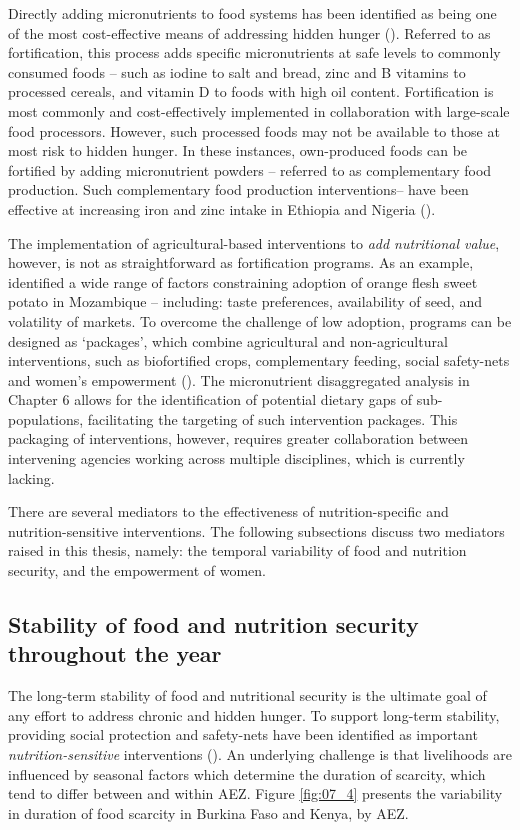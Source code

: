 Directly adding micronutrients to food systems has been identified as being one of the most cost-effective means of addressing hidden hunger (\citealp{Bhutta2013, Osendarp2018}). Referred to as fortification, this process adds specific micronutrients at safe levels to commonly consumed foods -- such as iodine to salt and bread, zinc and B vitamins to processed cereals, and vitamin D to foods with high oil content. Fortification is most commonly and cost-effectively implemented in collaboration with large-scale food processors. However, such processed foods may not be available to those at most risk to hidden hunger. In these instances, own-produced foods can be fortified by adding micronutrient powders -- referred to as complementary food production. Such complementary food production interventions-- have been effective at increasing iron and zinc intake in Ethiopia and Nigeria (\citealp{Masters2018}).

The implementation of agricultural-based interventions to \textit{add nutritional value}, however, is not as straightforward as fortification programs. As an example, \citet{Jenkins2018} identified a wide range of factors constraining adoption of orange flesh sweet potato in Mozambique -- including: taste preferences, availability of seed, and volatility of markets. To overcome the challenge of low adoption, programs can be designed as `packages', which combine agricultural and non-agricultural interventions, such as biofortified crops, complementary feeding, social safety-nets and women's empowerment (\citealp{Ruel2018, Jaenicke2013}). The micronutrient disaggregated analysis in Chapter 6 allows for the identification of potential dietary gaps of sub-populations, facilitating the targeting of such intervention packages. This packaging of interventions, however, requires greater collaboration between intervening agencies working across multiple disciplines, which is currently lacking.

There are several mediators to the effectiveness of nutrition-specific and nutrition-sensitive interventions. The following subsections discuss two mediators raised in this thesis, namely: the temporal variability of food and nutrition security, and the empowerment of women.

\subsection{Stability of food and nutrition security throughout the year}
The long-term stability of food and nutritional security is the ultimate goal of any effort to address chronic and hidden hunger. To support long-term stability, providing social protection and safety-nets have been identified as important \textit{nutrition-sensitive} interventions (\citealp{Bhutta2013}). An underlying challenge is that livelihoods are influenced by seasonal factors which determine the duration of scarcity, which tend to differ between and within AEZ. Figure \ref{fig:07_4} presents the variability in duration of food scarcity in Burkina Faso and Kenya, by AEZ.

